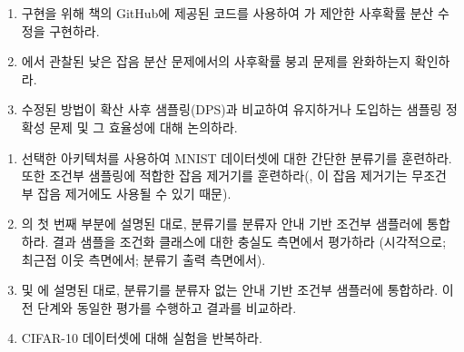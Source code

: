 \documentclass[../../book-main_ko.tex]{subfiles}
\begin{document}
\begin{exercise}

  \begin{enumerate}
    \item {} 구현을 위해 책의 GitHub에 제공된 코드를 사용하여 \textcite{rozet2024learning}가 제안한 사후확률 분산 수정을 구현하라.
    \item {}에서 관찰된 낮은 잡음 분산 문제에서의 사후확률 붕괴 문제를 완화하는지 확인하라.
    \item 수정된 방법이 확산 사후 샘플링(DPS)과 비교하여 유지하거나 도입하는 샘플링 정확성 문제 및 그 효율성에 대해 논의하라.
  \end{enumerate}

\end{exercise}

\begin{exercise}
  \begin{enumerate}
    \item 선택한 아키텍처를 사용하여 MNIST 데이터셋에 대한 간단한 분류기를 훈련하라. 또한 조건부 샘플링에 적합한 잡음 제거기를 훈련하라(, 이 잡음 제거기는 무조건부 잡음 제거에도 사용될 수 있기 때문).
    \item {}의 첫 번째 부분에 설명된 대로, 분류기를 분류자 안내 기반 조건부 샘플러에 통합하라. 결과 샘플을 조건화 클래스에 대한 충실도 측면에서 평가하라 (시각적으로; 최근접 이웃 측면에서; 분류기 출력 측면에서).
    \item {} 및 에 설명된 대로, 분류기를 분류자 없는 안내 기반 조건부 샘플러에 통합하라. 이전 단계와 동일한 평가를 수행하고 결과를 비교하라.
    \item CIFAR-10 데이터셋에 대해 실험을 반복하라.
  \end{enumerate}

\end{exercise}
\end{document}
